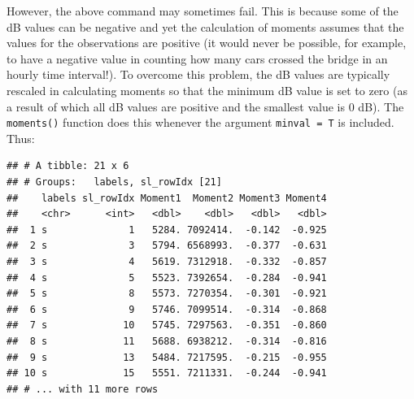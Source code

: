\documentclass[]{book}
\newenvironment{Shaded}{\begin{snugshade}}{\end{snugshade}}
\newcommand{\DataTypeTok}[1]{\textcolor[rgb]{0.13,0.29,0.53}{#1}}
\newcommand{\DecValTok}[1]{\textcolor[rgb]{0.00,0.00,0.81}{#1}}
\newcommand{\KeywordTok}[1]{\textcolor[rgb]{0.13,0.29,0.53}{\textbf{#1}}}
\newcommand{\NormalTok}[1]{#1}
\newcommand{\OperatorTok}[1]{\textcolor[rgb]{0.81,0.36,0.00}{\textbf{#1}}}
\newcommand{\OtherTok}[1]{\textcolor[rgb]{0.56,0.35,0.01}{#1}}
\newcommand{\StringTok}[1]{\textcolor[rgb]{0.31,0.60,0.02}{#1}}
\begin{document}
However, the above command may sometimes fail. This is because some of the dB values can be negative and yet the calculation of moments assumes that the values for the observations are positive (it would never be possible, for example, to have a negative value in counting how many cars crossed the bridge in an hourly time interval!). To overcome this problem, the dB values are typically rescaled in calculating moments so that the minimum dB value is set to zero (as a result of which all dB values are positive and the smallest value is 0 dB). The \texttt{moments()} function does this whenever the argument \texttt{minval\ =\ T} is included. Thus:

\begin{Shaded}
\end{Shaded}

\begin{verbatim}
## # A tibble: 21 x 6
## # Groups:   labels, sl_rowIdx [21]
##    labels sl_rowIdx Moment1  Moment2 Moment3 Moment4
##    <chr>      <int>   <dbl>    <dbl>   <dbl>   <dbl>
##  1 s              1   5284. 7092414.  -0.142  -0.925
##  2 s              3   5794. 6568993.  -0.377  -0.631
##  3 s              4   5619. 7312918.  -0.332  -0.857
##  4 s              5   5523. 7392654.  -0.284  -0.941
##  5 s              8   5573. 7270354.  -0.301  -0.921
##  6 s              9   5746. 7099514.  -0.314  -0.868
##  7 s             10   5745. 7297563.  -0.351  -0.860
##  8 s             11   5688. 6938212.  -0.314  -0.816
##  9 s             13   5484. 7217595.  -0.215  -0.955
## 10 s             15   5551. 7211331.  -0.244  -0.941
## # ... with 11 more rows
\end{verbatim}
\end{document}
